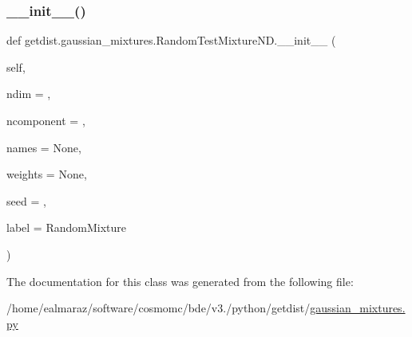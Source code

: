 \subsubsection{\texorpdfstring{\+\_\+\+\_\+init\+\_\+\+\_\+()}{\_\_init\_\_()}}
{\footnotesize\ttfamily def getdist.\+gaussian\+\_\+mixtures.\+Random\+Test\+Mixture\+N\+D.\+\_\+\+\_\+init\+\_\+\+\_\+ (\begin{DoxyParamCaption}\item[{}]{self,  }\item[{}]{ndim = {},  }\item[{}]{ncomponent = {},  }\item[{}]{names = {\ttfamily None},  }\item[{}]{weights = {\ttfamily None},  }\item[{}]{seed = {},  }\item[{}]{label = {\ttfamily \textquotesingle{}RandomMixture\textquotesingle{}} }\end{DoxyParamCaption})}



The documentation for this class was generated from the following file\+:\begin{DoxyCompactItemize}
\item 
/home/ealmaraz/software/cosmomc/bde/v3./python/getdist/\mbox{\hyperlink{gaussian__mixtures_8py}{gaussian\+\_\+mixtures.\+py}}\end{DoxyCompactItemize}

